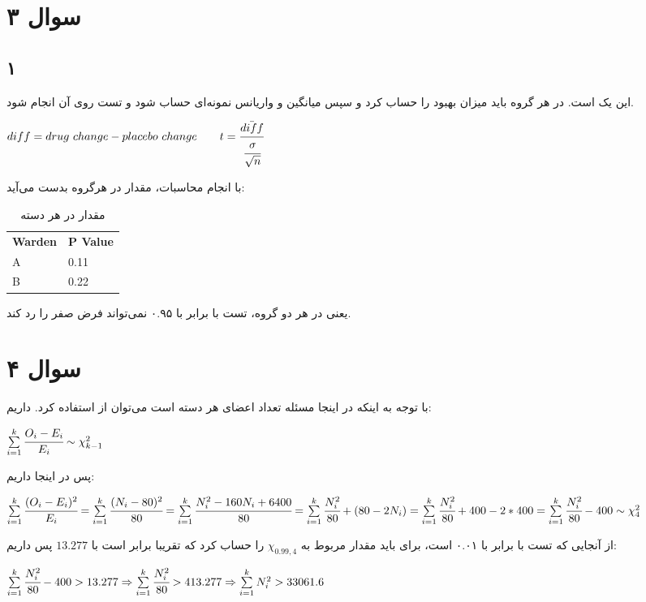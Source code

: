 \documentclass[12pt]{article}
\begin{document}
\section{سوال ۳}
\subsection{۱}
این یک 
است. در هر گروه باید میزان بهبود را حساب کرد و سپس میانگین و واریانس نمونه‌ای حساب شود و تست روی آن انجام شود. 
\begin{latin}
	$
	diff = drug\ change - placebo\ change \qquad
	t = \cfrac{\bar{diff}}{\cfrac{\sigma}{\sqrt{n}}}
	$
\end{latin}
با انجام محاسبات، مقدار  در هرگروه بدست می‌آید:
\begin{table}[H]
	\centering
	\caption{مقدار  در هر دسته}
	\begin{latin}
		\label{tab:q3_table}
		\begin{tabular}{| l l  |}
			\toprule
			\textbf{Warden} &  \textbf{P Value} \\
			A & 0.11 \\
			B & 0.22 \\
			\bottomrule
		\end{tabular}
	\end{latin}
\end{table}
یعنی در هر دو گروه، تست  با 
برابر با ۰.۹۵ نمی‌تواند فرض صفر را رد کند.

\section{سوال ۴}
با توجه به اینکه در اینجا مسئله تعداد اعضای هر دسته است می‌توان از 
استفاده کرد. داریم:
\begin{latin}
	$
    \sum\limits_{i = 1}^k	\cfrac{O_i - E_i}{E_i} \sim \chi^2_{k - 1}
	$
\end{latin}
پس در اینجا داریم:
\begin{latin}
	$
	\sum\limits_{i = 1}^k	\cfrac{(O_i - E_i)^2}{E_i} 
	=
	\sum\limits_{i = 1}^k	\cfrac{(N_i - 80)^2}{80} 
	=
	\sum\limits_{i = 1}^k	\cfrac{N_i^2 - 160 N_i + 6400}{80}
	=
	\sum\limits_{i = 1}^k	\cfrac{N_i^2}{80} + (80 - 2N_i)
	=
	\sum\limits_{i = 1}^k	\cfrac{N_i^2}{80} + 400 - 2 * 400
	=
	\sum\limits_{i = 1}^k	\cfrac{N_i^2}{80} - 400
	\sim \chi^2_4
	$
\end{latin}
از آنجایی که تست با 
برابر با ۰.۰۱ است، برای 
باید مقدار 
مربوط به 
$\chi_{0.99, 4}$
را حساب کرد که تقریبا برابر است با
$13.277$
پس داریم:
\begin{latin}
	$
	\sum\limits_{i = 1}^k	\cfrac{N_i^2}{80} - 400 > 13.277
	\Rightarrow
	\sum\limits_{i = 1}^k	\cfrac{N_i^2}{80} > 413.277
	\Rightarrow
	\sum\limits_{i = 1}^k	N_i^2 > 33061.6
	$
\end{latin}
\end{document}
